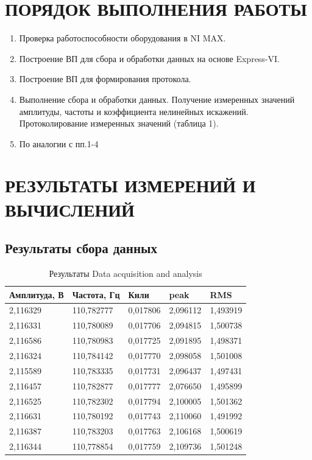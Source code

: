 \documentclass[a4paper,14pt]{article}
\begin{document}
\section{ПОРЯДОК ВЫПОЛНЕНИЯ РАБОТЫ}
\begin{enumerate}
	\item Проверка работоспособности оборудования в NI MAX. 
	\item Построение ВП для сбора и обработки данных на основе Express-VI.
	\item Построение ВП для формирования протокола. 
	\item Выполнение сбора и обработки данных. Получение измеренных значений амплитуды, частоты и коэффициента нелинейных искажений. Протоколирование измеренных значений (таблица 1).
	\item По аналогии с пп.1-4
\end{enumerate}

\section{РЕЗУЛЬТАТЫ ИЗМЕРЕНИЙ И ВЫЧИСЛЕНИЙ}

\subsection{Результаты сбора данных}

\begin{table}[H]
	\centering
	\caption{Результаты Data acquisition and analysis}
	\label{tab:daa}
	\begin{tabular}{|l|l|l|l|l|}
		\hline
		Амплитуда, В & Частота, Гц & Кнли     & peak     & RMS      \\ \hline
		2,116329     & 110,782777  & 0,017806 & 2,096112 & 1,493919 \\ \hline
		2,116331     & 110,780089  & 0,017706 & 2,094815 & 1,500738 \\ \hline
		2,116586     & 110,780983  & 0,017725 & 2,091895 & 1,498371 \\ \hline
		2,116324     & 110,784142  & 0,017770 & 2,098058 & 1,501008 \\ \hline
		2,115589     & 110,783335  & 0,017731 & 2,096437 & 1,497431 \\ \hline
		2,116457     & 110,782877  & 0,017777 & 2,076650 & 1,495899 \\ \hline
		2,116525     & 110,782302  & 0,017794 & 2,100005 & 1,501362 \\ \hline
		2,116631     & 110,780192  & 0,017743 & 2,110060 & 1,491992 \\ \hline
		2,116387     & 110,783203  & 0,017763 & 2,106168 & 1,500619 \\ \hline
		2,116344     & 110,778854  & 0,017759 & 2,109736 & 1,501248 \\ \hline
	\end{tabular}
\end{table}
\end{document}
